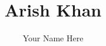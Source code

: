 \documentclass{article}
\title{Arish Khan}
\author{Your Name Here}
\begin{document}
\maketitle
\pagebreak


\pagebreak


\pagebreak


\pagebreak


\pagebreak

    
\end{document}
